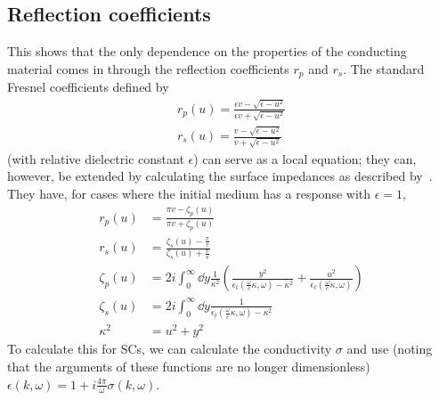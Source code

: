 \documentclass[11pt]{article}
\begin{document}
	\subsection{Reflection coefficients} \label{subsec:ReflectionCoeffs}
	This shows that the only dependence on the properties of the conducting material comes in through the reflection coefficients $r_p$ and $r_s$.
	The standard Fresnel coefficients defined by
	\begin{align}
		r_p(u) = \frac{\epsilon v - \sqrt{\epsilon - u^2}}{\epsilon v + \sqrt{\epsilon - u^2}} \\
		r_s(u) = \frac{v - \sqrt{\epsilon - u^2}}{v + \sqrt{\epsilon - u^2}}
	\end{align}
	(with relative dielectric constant $\epsilon$) can serve as a local equation;
	they can, however, be extended by calculating the surface impedances as described by~\cite{Ford1984}.
	They have, for cases where the initial medium has a response with $\epsilon = 1$,
	\begin{align}
		r_p(u) &= \frac{\pi v - \zeta_p(u)}{\pi v + \zeta_p(u)} \\
		r_s(u) &= \frac{\zeta_s(u) - \frac{\pi}{v}}{\zeta_s(u) + \frac{\pi}{v}} \\
		\zeta_p(u) &= 2i \int_0^\infty \dd{y} \frac{1}{\kappa^2} \left( \frac{y^2}{\epsilon_t(\frac{\omega}{c}\kappa, \omega) - \kappa^2} + \frac{u^2}{\epsilon_\ell(\frac{\omega}{c}\kappa, \omega)} \right) \\
		\zeta_s(u) &= 2i \int_0^\infty \dd{y} \frac{1}{\epsilon_t(\frac{\omega}{c}\kappa, \omega) - \kappa^2} \\
		\kappa^2 &= u^2 + y^2
	\end{align}
	To calculate this for SCs, we can calculate the conductivity $\sigma$ and use (noting that the arguments of these functions are no longer dimensionless) $\epsilon(k, \omega) = 1 + i \frac{4 \pi}{\omega} \sigma(k, \omega)$.

	\newpage
	\listoftodos
	\newpage
	\printbibliography
\end{document}
